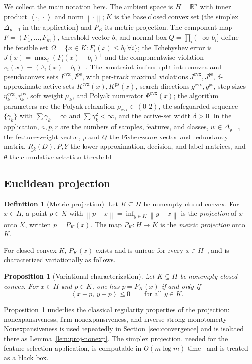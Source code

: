 \documentclass[]{interact}
\theoremstyle{plain}
\newtheorem{proposition}[theorem]{Proposition}
\theoremstyle{definition}
\newtheorem{definition}[theorem]{Definition}
\theoremstyle{remark}
\newcommand{\R}{\mathbb{R}}
\newcommand{\norm}[1]{\left\lVert #1 \right\rVert}
\newcommand{\inner}[2]{\left\langle #1,\, #2 \right\rangle}
\newcommand{\cvx}{\mathrm{cvx}}
\newcommand{\ps}{\mathrm{ps}}
\begin{document}
We collect the main notation here. The ambient space is $H=\R^n$ with inner product
$\inner{\cdot}{\cdot}$ and norm $\norm{\cdot}$; $K$ is the base closed convex set (the simplex
$\Delta_{p-1}$ in the application) and $P_K$ its metric projection. The component map
$F=(F_1,\dots,F_m)$, threshold vector $b$, and normal box $Q=\prod_i(-\infty,b_i]$ define the
feasible set $\Omega=\{x\in K:F_i(x)\le b_i\ \forall i\}$; the Tchebyshev error is
$J(x)=\max_i(F_i(x)-b_i)^+$ and the componentwise violation $v_i(x)=(F_i(x)-b_i)^+$. The
constraint indices split into convex and pseudoconvex sets $I^{\cvx},I^{\ps}$, with per-track
maximal violations $J^{\cvx},J^{\ps}$, $\delta$-approximate active sets $K^{\cvx}(x),K^{\ps}(x)$,
search directions $g^{\cvx},g^{\ps}$, step sizes $\eta^{\cvx}_k,\eta^{\ps}_k$, soft weight
$\mu_k$, and Polyak numerator $\Phi^{\cvx}(x)$; the algorithm parameters are the Polyak relaxation
$\rho_{\cvx}\in(0,2)$, the safeguarded sequence $\{\gamma_k\}$ with $\sum\gamma_k=\infty$ and
$\sum\gamma_k^2<\infty$, and the active-set width $\delta>0$. In the application, $n,p,r$ are the
numbers of samples, features, and classes, $w\in\Delta_{p-1}$ the feature-weight vector, $\rho$
and $Q$ the Fisher-score vector and redundancy matrix, $\underline{R_k}(D),P,Y$ the
lower-approximation, decision, and label matrices, and $\theta$ the cumulative selection
threshold.

\subsection{Euclidean projection}\label{ssec:projection}
\begin{definition}[Metric projection]\label{def:projection}
Let $K\subseteq H$ be nonempty closed convex. For $x\in H$, a point $p\in K$ with
$\norm{p-x}=\inf_{y\in K}\norm{y-x}$ is the \emph{projection} of $x$ onto $K$, written
$p=P_K(x)$. The map $P_K:H\to K$ is the \emph{metric projection} onto $K$.
\end{definition}
For closed convex $K$, $P_K(x)$ exists and is unique for every
$x\in H$~\citep{bauschke2011}, and is characterized variationally as follows.
\begin{proposition}[Variational characterization]\label{prop:proj-char}
Let $K\subseteq H$ be nonempty closed convex. For $x\in H$ and $p\in K$, one has
$p=P_K(x)$ if and only if
\begin{equation}\label{eq:proj-char}
\inner{x-p}{y-p}\le 0\qquad\text{for all }y\in K .
\end{equation}
\end{proposition}
Proposition~\ref{prop:proj-char} underlies the classical regularity properties of the
projection: nonexpansiveness, firm nonexpansiveness, and inverse strong
monotonicity~\citep{bauschke2011}. Nonexpansiveness is used repeatedly in
Section~\ref{sec:convergence} and is isolated there as Lemma~\ref{lem:proj-nonexp}.
The simplex projection, needed for the feature-selection application, is computable in
$O(m\log m)$ time~\citep{condat2016simplex} and is treated as a black box.
\end{document}
